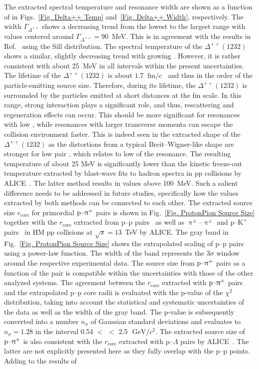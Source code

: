 \documentclass[ALICE,manyauthors]{cernphprep}
\begin{document}
The extracted spectral temperature and resonance width are shown as a function of \mtText{} in Figs.~\ref{Fig. Delta++ Temp} and~\ref{Fig. Delta++ Width}, respectively. The width $\Gamma_{\Delta^{++}}$ shows a decreasing trend from the lowest to the largest \mtText{} range with values centered around $\Gamma_{\Delta^{++}} = 90$~MeV. This is in agreement with the results in Ref.~\cite{GiacosaSill} using the Sill distribution.  The spectral temperature of the $\Delta^{++}(1232)$ shows a similar, slightly decreasing trend with growing \mtText{}. However, it is rather consistent with about 25~MeV in all \mtText{} intervals within the present uncertainties. The lifetime of the $\Delta^{++}(1232)$ is about $1.7~\text{ fm}/c$~\cite{PDG} and thus in the order of the particle-emitting source size. Therefore, during its lifetime, the $\Delta^{++}(1232)$ is surrounded by the particles emitted at short distances at the fm scale. In this range, strong interaction plays a significant role, and thus, rescattering and regeneration effects can occur. This should be more significant for resonances with low \ptText, while resonances with larger transverse momenta can escape the collision environment faster. This is indeed seen in the extracted shape of the $\Delta^{++}(1232)$ as the distortions from a typical Breit--Wigner-like shape are stronger for low pair \mtText, which relates to low \ptText{} of the resonance. The resulting temperature of about 25 MeV is significantly lower than the kinetic freeze-out temperature extracted by blast-wave fits to hadron spectra in pp collisions by ALICE~\cite{ALICE:2020nkc}. The latter method results in values above 100~MeV. Such a salient difference needs to be addressed in future studies, specifically how the values extracted by both methods can be connected to each other. The extracted source size $r_\text{core}$ for primordial $\text{p--}\uppi^+$ pairs is shown in Fig.~\ref{Fig. ProtonPion Source Size} together with the $r_\text{core}$ extracted from p--p pairs~\cite{ppSourceErratum} as well as $\uppi^\pm$--$\uppi^\pm$ and p--$\text{K}^+$ pairs~\cite{ALICE:2023sjd} in HM pp collisions at $\sqrt{s}=13$~TeV by ALICE. The gray band in Fig.~\ref{Fig. ProtonPion Source Size} shows the extrapolated scaling of p--p pairs~\cite{ppSourceErratum} using a power-law function. The width of the band represents the $3\sigma$ window around the respective experimental data. The source size from $\text{p--}\uppi^+$ pairs as a function of the pair \mtText{} is compatible within the uncertainties with those of the other analyzed systems. The agreement between the $r_\text{core}$ extracted with $\text{p--}\uppi^+$ pairs and the extrapolated p--p core radii is evaluated with the p-value of the $\chi^2$ distribution, taking into account the statistical and systematic uncertainties of the data as well as the width of the gray band. The p-value is subsequently converted into a number $n_\sigma$ of Gaussian standard deviations and evaluates to $n_\sigma = 1.28$ in the interval 0.54 $<$ \mtText{} $<$ 2.5 $\text{ GeV}/c^2$. The extracted source size of $\text{p--}\uppi^+$ is also consistent with the $r_\text{core}$ extracted with p--$\Lambda$ pairs by ALICE~\cite{ppSourceErratum}. The latter are not explicitly presented here as they fully overlap with the p--p points. Adding to the results of 
\end{document}
